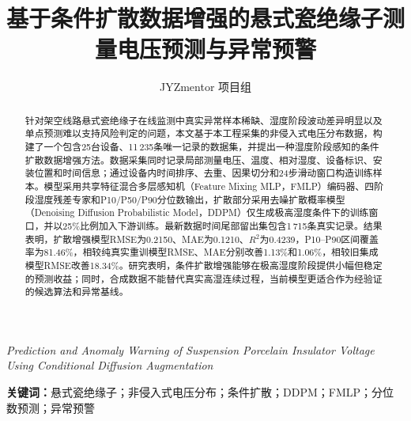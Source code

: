 \documentclass[UTF8,a4paper,10pt]{ctexart}
\title{\bfseries 基于条件扩散数据增强的悬式瓷绝缘子测量电压预测与异常预警}
\author{JYZmentor 项目组}
\date{}
\newcommand{\ddpm}{DDPM}
\newcommand{\fmlp}{FMLP}
\begin{document}
\maketitle
\begin{center}
\textit{Prediction and Anomaly Warning of Suspension Porcelain Insulator Voltage Using Conditional Diffusion Augmentation}
\end{center}

\begin{abstract}
针对架空线路悬式瓷绝缘子在线监测中真实异常样本稀缺、湿度阶段波动差异明显以及单点预测难以支持风险判定的问题，本文基于本工程采集的非侵入式电压分布数据，构建了一个包含25台设备、11\,235条唯一记录的数据集，并提出一种湿度阶段感知的条件扩散数据增强方法。数据采集同时记录局部测量电压、温度、相对湿度、设备标识、安装位置和时间信息；通过设备内时间排序、去重、因果切分和24步滑动窗口构造训练样本。模型采用共享特征混合多层感知机（Feature Mixing MLP，\fmlp{}）编码器、四阶段湿度残差专家和P10/P50/P90分位数输出，扩散部分采用去噪扩散概率模型（Denoising Diffusion Probabilistic Model，\ddpm{}）仅生成极高湿度条件下的训练窗口，并以25\%比例加入下游训练。最新数据时间尾部留出集包含1\,715条真实记录。结果表明，扩散增强模型RMSE为0.2150、MAE为0.1210、$R^2$为0.4239，P10--P90区间覆盖率为81.46\%，相较纯真实重训模型RMSE、MAE分别改善1.13\%和1.06\%，相较旧集成模型RMSE改善18.34\%。研究表明，条件扩散增强能够在极高湿度阶段提供小幅但稳定的预测收益；同时，合成数据不能替代真实高湿连续过程，当前模型更适合作为经验证的候选算法和异常基线。
\end{abstract}

\noindent\textbf{关键词：}悬式瓷绝缘子；非侵入式电压分布；条件扩散；DDPM；FMLP；分位数预测；异常预警
\end{document}
